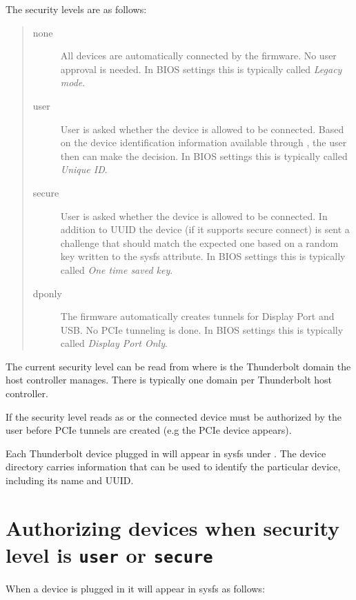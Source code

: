 \documentclass[a4paper,8pt,english]{sphinxmanual}
\begin{document}
The security levels are as follows:
\begin{quote}
\begin{description}
\item[{none}] \leavevmode
All devices are automatically connected by the firmware. No user
approval is needed. In BIOS settings this is typically called
\emph{Legacy mode}.

\item[{user}] \leavevmode
User is asked whether the device is allowed to be connected.
Based on the device identification information available through
, the user then can make the decision.
In BIOS settings this is typically called \emph{Unique ID}.

\item[{secure}] \leavevmode
User is asked whether the device is allowed to be connected. In
addition to UUID the device (if it supports secure connect) is sent
a challenge that should match the expected one based on a random key
written to the  sysfs attribute. In BIOS settings this is
typically called \emph{One time saved key}.

\item[{dponly}] \leavevmode
The firmware automatically creates tunnels for Display Port and
USB. No PCIe tunneling is done. In BIOS settings this is
typically called \emph{Display Port Only}.

\end{description}
\end{quote}

The current security level can be read from
 where  is
the Thunderbolt domain the host controller manages. There is typically
one domain per Thunderbolt host controller.

If the security level reads as  or  the connected
device must be authorized by the user before PCIe tunnels are created
(e.g the PCIe device appears).

Each Thunderbolt device plugged in will appear in sysfs under
. The device directory carries
information that can be used to identify the particular device,
including its name and UUID.


\section{Authorizing devices when security level is \texttt{user} or \texttt{secure}}
\label{admin-guide/thunderbolt:authorizing-devices-when-security-level-is-user-or-secure}
When a device is plugged in it will appear in sysfs as follows:
\end{document}
